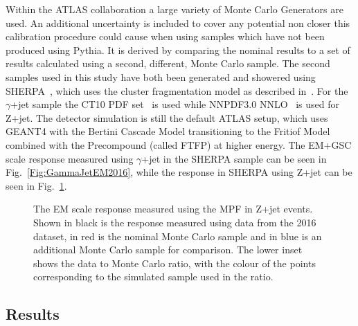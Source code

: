 Within the ATLAS collaboration a large variety of Monte Carlo Generators are used.  
An additional uncertainty is included to cover any potential non closer this calibration procedure could cause when using samples which have not been produced using Pythia.  
It is derived by comparing the nominal results to a set of results calculated using a second, different, Monte Carlo sample.  
The second samples used in this study have both been generated and showered using {\sc SHERPA}~\cite{Gleisberg:2008ta}, which uses the cluster fragmentation model as described in~\cite{1983NuPhB.214..201G}.  
For the $\gamma$+jet sample the CT10 PDF set~\cite{Lai:2010vv} is used while NNPDF3.0 NNLO~\cite{Ball:2014uwa} is used for Z+jet.  
The detector simulation is still the default ATLAS setup, which uses GEANT4 with the Bertini Cascade Model transitioning to the Fritiof Model combined with the Precompound (called FTFP) at higher energy.   
The EM+GSC scale response measured using $\gamma$+jet in the {\sc SHERPA} sample can be seen in Fig.~\ref{Fig:GammaJetEM2016}, while the response in {\sc SHERPA} using Z+jet can be seen in Fig.~\ref{Fig:ZJetEM2016}.  

\begin{figure}[!ht]
 \begin{center}
 \end{center}
 \caption[EM scale response using Z+jet in 2016]
 {\small The EM scale response measured using the MPF in Z+jet events.  Shown in black is the response measured using data from the 2016 dataset, in red is the nominal Monte Carlo sample and in blue is an additional Monte Carlo sample for comparison.  The lower inset shows the data to Monte Carlo ratio, with the colour of the points corresponding to the simulated sample used in the ratio.  }
 \label{Fig:ZJetEM2016}
\end{figure}

\subsection{Results}

